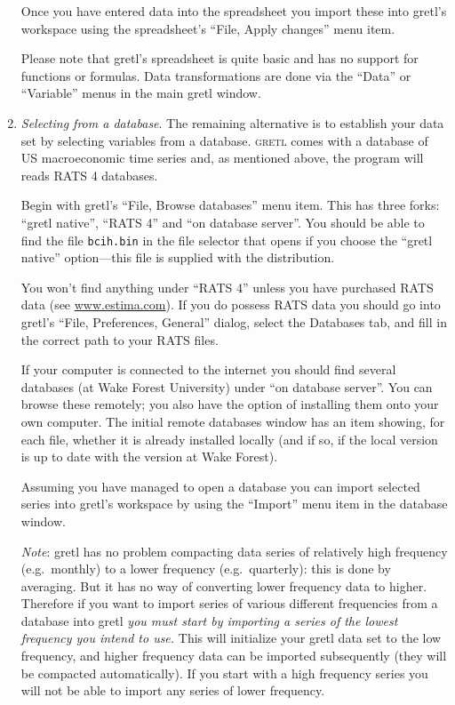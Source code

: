 \documentclass{article}
\begin{document}
\begin{enumerate}
  Once you have entered data into the spreadsheet you import these
  into \textsf{gretl}'s workspace using the spreadsheet's ``File,
  Apply changes'' menu item.

  Please note that \textsf{gretl}'s spreadsheet is quite basic and
  has no support for functions or formulas.  Data transformations are
  done via the ``Data'' or ``Variable'' menus in the main
  \textsf{gretl} window.  

\item \textit{Selecting from a database}.  The remaining alternative
  is to establish your data set by selecting variables from a
  database.  \textsc{gretl} comes with a database of US macroeconomic
  time series and, as mentioned above, the program will reads RATS 4
  databases.  
  
  Begin with \textsf{gretl}'s ``File, Browse databases'' menu item.
  This has three forks: ``gretl native'', ``RATS 4'' and ``on database
  server''.  You should be able to find the file \texttt{bcih.bin} in
  the file selector that opens if you choose the ``gretl native''
  option---this file is supplied with the distribution.
  
  You won't find anything under ``RATS 4'' unless you have purchased
  RATS data (see \url{www.estima.com}).  If you do possess RATS data
  you should go into \textsf{gretl}'s ``File, Preferences, General''
  dialog, select the Databases tab, and fill in the correct path to
  your RATS files.
  
  If your computer is connected to the internet you should find
  several databases (at Wake Forest University) under ``on database
  server''.  You can browse these remotely; you also have the option
  of installing them onto your own computer.  The initial remote
  databases window has an item showing, for each file, whether it is
  already installed locally (and if so, if the local version is up to
  date with the version at Wake Forest).

  Assuming you have managed to open a database you can import
  selected series into \textsf{gretl}'s workspace by using the
  ``Import'' menu item in the database window.  
  
  \textit{Note}: \textsf{gretl} has no problem compacting data series
  of relatively high frequency (e.g.\ monthly) to a lower frequency
  (e.g.\ quarterly): this is done by averaging.  But it has no way of
  converting lower frequency data to higher.  Therefore if you want to
  import series of various different frequencies from a database into
  \textsf{gretl} \textit{you must start by importing a series of the
    lowest frequency you intend to use.} This will initialize your
  \textsf{gretl} data set to the low frequency, and higher frequency
  data can be imported subsequently (they will be compacted
  automatically).  If you start with a high frequency series you will
  not be able to import any series of lower frequency.

\end{enumerate}
\end{document}
